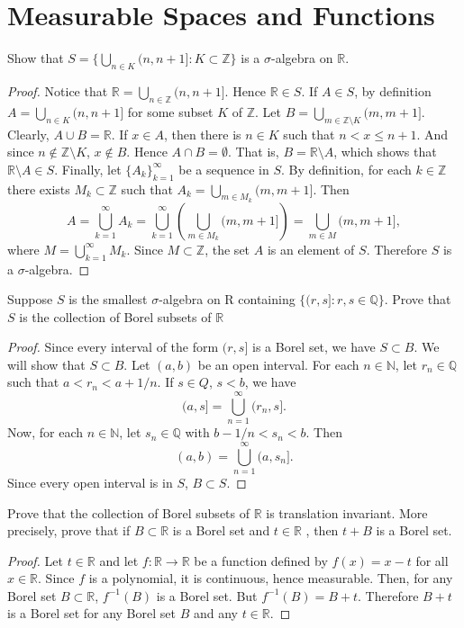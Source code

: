 \documentclass[14.5pt]{article}
\newcommand{\N}{\mathbb{N}}
\newcommand{\Z}{\mathbb{Z}}
\newcommand{\Q}{\mathbb{Q}}
\newcommand{\R}{\mathbb{R}}
\newenvironment{problem}[2][Problem]{\begin{mdframed}[backgroundcolor=gray!10, leftline = false, rightline=false, linewidth=0.25pt]  \begin{trivlist}
\item[\hskip \labelsep {\bfseries #1}\hskip \labelsep {\bfseries #2.}]}{\end{trivlist} \end{mdframed}  }
\begin{document}
\section*{Measurable Spaces and Functions}

\begin{problem}{2B.1} Show that $S = \{ \bigcup_{n\in K}(n, n+1]: K \subset \Z \}$ is a $\sigma$-algebra on $\R.$
\end{problem}
\begin{proof}
    Notice that $\R = \bigcup_{n \in \Z}(n, n+1]$. Hence $\R \in S.$ If $A \in S$, by definition $A = \bigcup_{n \in K}(n, n+1]$ for some subset $K$ of $\Z.$ Let $B = \bigcup_{m \in \Z \setminus K }(m, m+1]$. Clearly, $A \cup B = \R.$ If $x \in A$, then there is $n \in K$ such that $n < x \leq n+1.$ And since $n \notin \Z \setminus K$, $x \notin B.$ Hence $A \cap B = \emptyset.$ That is, $B = \R \setminus A$, which shows that $\R \setminus A \in S.$ 
    Finally, let $\{A_k\}_{k=1}^\infty$ be a sequence in $S.$ By definition, for each $k \in \Z$ there exists $M_k \subset \Z$ such that $A_k = \bigcup_{m \in M_k} (m, m+1].$ Then
$$A = \bigcup_{k=1}^\infty A_k = \bigcup_{k=1}^\infty\left( \bigcup_{m \in M_k} (m, m+1] \right) = \bigcup_{m \in M} (m, m+1], $$
where $M = \bigcup_{k=1}^\infty M_k$. Since $M \subset \Z$, the set $A$ is an element of $S$. Therefore $S$ is a $\sigma$-algebra.
\end{proof}

\begin{problem}{2B.3}
Suppose $S$ is the smallest $\sigma$-algebra on R containing $\{(r,s] : r,s \in \Q\}$. Prove
that $S$ is the collection of Borel subsets of $\R$
\end{problem}
\begin{proof}
Since every interval of the form $(r, s]$ is a Borel set, we have $S \subset B$. We will show that $S \subset B.$
Let $(a,b)$ be an open interval. For each $n \in \N$, let $r_n \in \Q$ such that $a < r_n < a + 1/n$. If $s\in Q$, $s < b$, we have
$$ (a, s] = \bigcup_{n=1}^\infty (r_n, s].$$
Now, for each $n \in \N$, let $s_n \in \Q$ with
$b - 1/n  < s_n < b $. Then
$$(a, b) = \bigcup_{n=1}^\infty (a, s_n].$$
Since every open interval is in $S$, $B \subset S.$
\end{proof}

\begin{problem}{2B.7}
Prove that the collection of Borel subsets of $\R$ is translation invariant. More precisely,
prove that if $B \subset \R$ is a Borel set and $t \in \R$ , then $t + B $ is a Borel set.
\end{problem}
\begin{proof}
    Let $t \in \R$ and let $f: \R \rightarrow \R$ be a function defined by $f(x) = x - t$ for all $x \in \R$. Since $f$ is a polynomial, it is continuous, hence measurable. Then, for any Borel set $B \subset \R$, $f^{-1}(B)$ is a Borel set. But $f^{-1}(B) = B + t$. Therefore $B + t$ is a Borel set for any Borel set $B$ and any $t \in \R.$
\end{proof}
\end{document}
